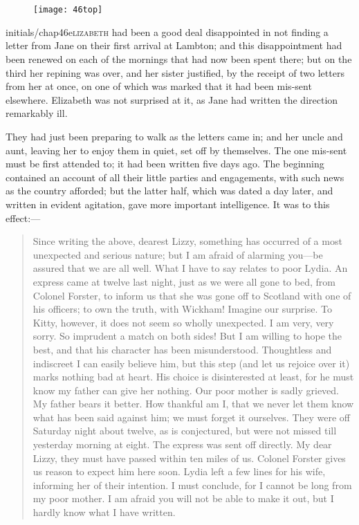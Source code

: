 \chapter[Chapter \thechapter]{}
	
	
\begin{figure}[t!]
\centering
\texttt{[image: 46top]}
\end{figure}


\lettrine[lines=6,image=true]{initials/chap46e}{lizabeth}  had been a good deal disappointed in not finding a letter from Jane on their first arrival at Lambton; and this disappointment had been renewed on each of the mornings that had now been spent there; but on the third her repining was over, and her sister justified, by the receipt of two letters from her at once, on one of which was marked that it had been mis-sent elsewhere. Elizabeth was not surprised at it, as Jane had written the direction remarkably ill.

They had just been preparing to walk as the letters came in; and her uncle and aunt, leaving her to enjoy them in quiet, set off by themselves. The one mis-sent must be first attended to; it had been written five days ago. The beginning contained an account of all their little parties and engagements, with such news as the country afforded; but the latter half, which was dated a day later, and written in evident agitation, gave more important intelligence. It was to this effect:—


\begin{quotation}
\indent Since writing the above, dearest Lizzy, something has occurred of a most unexpected and serious nature; but I am afraid of alarming you—be assured that we are all well. What I have to say relates to poor Lydia. An express came at twelve last night, just as we were all gone to bed, from Colonel Forster, to inform us that she was gone off to Scotland with one of his officers; to own the truth, with Wickham! Imagine our surprise. To Kitty, however, it does not seem so wholly unexpected. I am very, very sorry. So imprudent a match on both sides! But I am willing to hope the best, and that his character has been misunderstood. Thoughtless and indiscreet I can easily believe him, but this step (and let us rejoice over it) marks nothing bad at heart. His choice is disinterested at least, for he must know my father can give her nothing. Our poor mother is sadly grieved. My father bears it better. How thankful am I, that we never let them know what has been said against him; we must forget it ourselves. They were off Saturday night about twelve, as is conjectured, but were not missed till yesterday morning at eight. The express was sent off directly. My dear Lizzy, they must have passed within ten miles of us. Colonel Forster gives us reason to expect him here soon. Lydia left a few lines for his wife, informing her of their intention. I must conclude, for I cannot be long from my poor mother. I am afraid you will not be able to make it out, but I hardly know what I have written.
\end{quotation}


